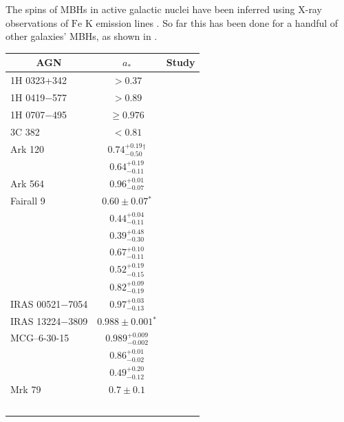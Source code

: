 The spins of MBHs in active galactic nuclei have been inferred using X-ray observations of $\mathrm{Fe}$ $\mathrm{K}$ emission lines \citep{Miller2007, McClintock2011}. So far this has been done for a handful of other galaxies' MBHs, as shown in .
\begin{table}[htp]
\centering
\begin{tabular}{l c l }
\toprule
\multicolumn{1}{c}{AGN} & \multicolumn{1}{c}{$a_\ast$} & \multicolumn{1}{c}{Study} \\ \midrule 
1H 0323+342 & $>0.37$ & \citet{Walton2013} \\ %
1H 0419$-$577 & $>0.89$ & \citet{Walton2013} \\ %
1H 0707$-$495 & $\geq 0.976$ & \citet{Zoghbi2010} \\ %
3C 382	& $<0.81$ & \citet{Walton2013} \\ %
Ark 120 & $0.74^{+0.19}_{-0.50}$$^\dagger$ & \citet{Nardini2011} \\ %
 & $0.64^{+0.19}_{-0.11}$ & \citet{Walton2013} \\ %
Ark 564 & $0.96^{+0.01}_{-0.07}$ & \citet{Walton2013} \\ %
Fairall 9 & $0.60 \pm 0.07$$^\ast$ & \citet{Schmoll2009} \\ %
 & $0.44^{+0.04}_{-0.11}$ & \citet{Patrick2011} \\ %
 & $0.39^{+0.48}_{-0.30}$ & \citet{Emmanoulopoulos2011} \\ %
 & $0.67^{+0.10}_{-0.11}$ & \citet{Patrick2011a} \\ %
 & $0.52^{+0.19}_{-0.15}$ & \citet{Lohfink2012} \\ %
 & $0.82^{+0.09}_{-0.19}$ & \citet{Walton2013} \\ %
IRAS 00521$-$7054 & $0.97^{+0.03}_{-0.13}$ & \citet{Tan2012} \\ %
IRAS 13224$-$3809 & $0.988 \pm 0.001$$^\ast$ & \citet{Fabian2013} \\ %
MCG--6-30-15 & $0.989^{+0.009}_{-0.002}$ & \citet{Brenneman2006} \\ %
 & $0.86^{+0.01}_{-0.02}$ & \citet{delaCallePerez2010} \\ %
 & $0.49^{+0.20}_{-0.12}$ & \citet{Patrick2011a} \\ %
Mrk 79 & $0.7 \pm 0.1$ & \citet{Gallo2011} \\ %
$$
\end{tabular}
\end{table}
